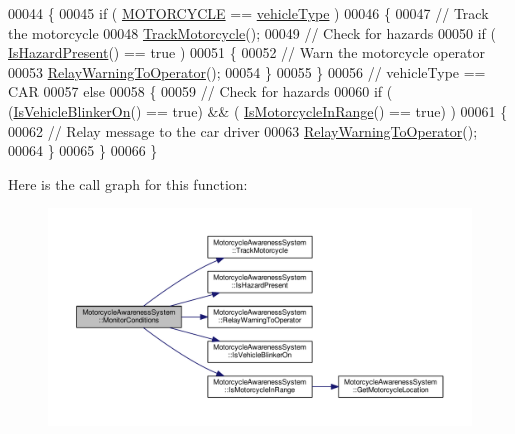 \begin{DoxyCode}
00044 \{
00045     \textcolor{keywordflow}{if} ( \hyperlink{MotorcycleAwarenessSystemTypes_8hpp_a0c05c42b98a847f971385c81c2a81afaa39b983b1f7acfc4e7c900d77b0fded6a}{MOTORCYCLE} == \hyperlink{classMotorcycleAwarenessSystem_a977b2085bfbf6a62902bf2d80160e6d2}{vehicleType} )
00046     \{
00047         \textcolor{comment}{// Track the motorcycle}
00048         \hyperlink{classMotorcycleAwarenessSystem_a4e6eec23ec46e24ee377a3c94e15eba4}{TrackMotorcycle}();
00049         \textcolor{comment}{// Check for hazards}
00050         \textcolor{keywordflow}{if} ( \hyperlink{classMotorcycleAwarenessSystem_a35d59c8299b0d5ef43c10306cc7f2ee1}{IsHazardPresent}() == \textcolor{keyword}{true} )
00051         \{
00052             \textcolor{comment}{// Warn the motorcycle operator}
00053             \hyperlink{classMotorcycleAwarenessSystem_aec5e4731c6bf0789821ba2793918e3ee}{RelayWarningToOperator}();
00054         \}
00055     \}
00056     \textcolor{comment}{// vehicleType == CAR}
00057     \textcolor{keywordflow}{else}
00058     \{
00059         \textcolor{comment}{// Check for hazards}
00060         \textcolor{keywordflow}{if} ( (\hyperlink{classMotorcycleAwarenessSystem_a9c3f98a014b0af39fa120f478eb5f348}{IsVehicleBlinkerOn}() == \textcolor{keyword}{true}) && (
      \hyperlink{classMotorcycleAwarenessSystem_a239655aca9c875b1dbbad3ce155c7892}{IsMotorcycleInRange}() == \textcolor{keyword}{true}) )
00061         \{
00062             \textcolor{comment}{// Relay message to the car driver}
00063             \hyperlink{classMotorcycleAwarenessSystem_aec5e4731c6bf0789821ba2793918e3ee}{RelayWarningToOperator}();
00064         \}
00065     \}
00066 \}
\end{DoxyCode}


Here is the call graph for this function\-:\nopagebreak
\begin{figure}[H]
\begin{center}
\leavevmode
\includegraphics[width=350pt]{classMotorcycleAwarenessSystem_afb19e832c17d43941d9ed6c4f4435a2e_cgraph}
\end{center}
\end{figure}




